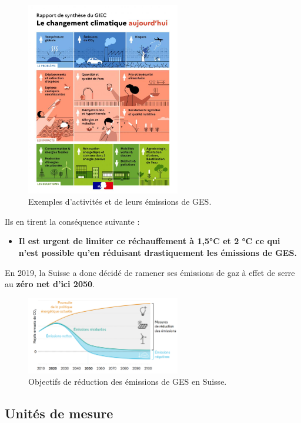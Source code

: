 \documentclass[11pt, a4paper]{book}
\begin{document}
\begin{figure}[h!]
  \centering
  \includegraphics[width=0.6\textwidth]{images/impact-eco/image8.png}
  \caption{Exemples d’activités et de leurs émissions de GES.}
  \label{fig:activites}
\end{figure}


Ils en tirent la conséquence suivante : 
\begin{itemize}
  \item \textbf{Il est urgent de limiter ce réchauffement à 1,5°C et 2 °C  ce qui n'est possible qu’en réduisant drastiquement les émissions de GES.}
\end{itemize}

En 2019, la Suisse a donc décidé de ramener ses émissions de gaz à effet de serre au \textbf{zéro net d’ici 2050}.

\begin{figure}[h!]
  \centering
  \includegraphics[width=0.6\textwidth]{images/impact-eco/image7.png}
  \caption{Objectifs de réduction des émissions de GES en Suisse.}
  \label{fig:objectif-suisse}
\end{figure}

\subsection{Unités de mesure}
\end{document}
